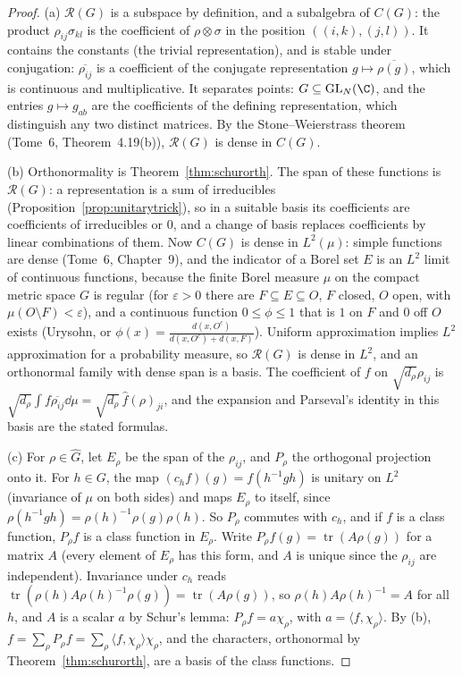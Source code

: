 \begin{proof}
(a) $\mathcal R(G)$ is a subspace by definition, and a subalgebra of $C(G)$: the product $\rho_{ij}\sigma_{kl}$ is the coefficient of $\rho\otimes\sigma$ in the position $((i,k),(j,l))$. It contains the constants (the trivial representation), and is stable under conjugation: $\overline{\rho_{ij}}$ is a coefficient of the conjugate representation
$g\mapsto\overline{\rho(g)}$, which is continuous and multiplicative. It separates points: $G\subseteq\mathrm{GL}_N(\C)$, and the entries $g\mapsto g_{ab}$ are the coefficients of the defining representation, which distinguish any two distinct matrices. By the
Stone--Weierstrass theorem (Tome~6, Theorem~4.19(b)), $\mathcal R(G)$ is dense in $C(G)$.

(b) Orthonormality is Theorem~\ref{thm:schurorth}. The span of these functions is $\mathcal R(G)$: a representation is a sum of irreducibles (Proposition~\ref{prop:unitarytrick}), so in a suitable basis its coefficients are coefficients of irreducibles or $0$,
and a change of basis replaces coefficients by linear combinations of them. Now $C(G)$ is dense in $L^2(\mu)$: simple functions are dense (Tome~6, Chapter~9), and the indicator of a Borel set $E$ is an $L^2$ limit of continuous functions, because the finite
Borel measure $\mu$ on the compact metric space $G$ is regular (for $\varepsilon>0$ there are $F\subseteq E\subseteq O$, $F$ closed, $O$ open, with $\mu(O\setminus F)<\varepsilon$), and a continuous function $0\le\phi\le1$ that is $1$ on $F$ and $0$ off $O$ exists (Urysohn,
or $\phi(x)=\frac{d(x,O^c)}{d(x,O^c)+d(x,F)}$). Uniform approximation implies $L^2$ approximation for a probability measure, so $\mathcal R(G)$ is dense in $L^2$, and an orthonormal family with dense span is a basis. The coefficient of $f$ on $\sqrt{d_\rho}\rho_{ij}$ is
$\sqrt{d_\rho}\int f\overline{\rho_{ij}}\dd\mu=\sqrt{d_\rho}\,\hat f(\rho)_{ji}$, and the expansion and Parseval's identity in this basis are the stated formulas.

(c) For $\rho\in\widehat G$, let $E_\rho$ be the span of the $\rho_{ij}$, and $P_\rho$ the orthogonal projection onto it. For $h\in G$, the map $(c_hf)(g)=f(h^{-1}gh)$ is unitary on $L^2$ (invariance of $\mu$ on both sides) and maps $E_\rho$ to itself, since
$\rho(h^{-1}gh)=\rho(h)^{-1}\rho(g)\rho(h)$. So $P_\rho$ commutes with $c_h$, and if $f$ is a class function, $P_\rho f$ is a class function in $E_\rho$. Write $P_\rho f(g)=\operatorname{tr}(A\rho(g))$ for a matrix $A$ (every element of $E_\rho$ has this form,
and $A$ is unique since the $\rho_{ij}$ are independent). Invariance under $c_h$ reads $\operatorname{tr}(\rho(h)A\rho(h)^{-1}\rho(g))=\operatorname{tr}(A\rho(g))$, so $\rho(h)A\rho(h)^{-1}=A$ for all $h$, and $A$ is a scalar $a$ by Schur's lemma: $P_\rho f=a\chi_\rho$, with
$a=\langle f,\chi_\rho\rangle$. By (b), $f=\sum_\rho P_\rho f=\sum_\rho\langle f,\chi_\rho\rangle\chi_\rho$, and the characters, orthonormal by Theorem~\ref{thm:schurorth}, are a basis of the class functions.
\end{proof}

